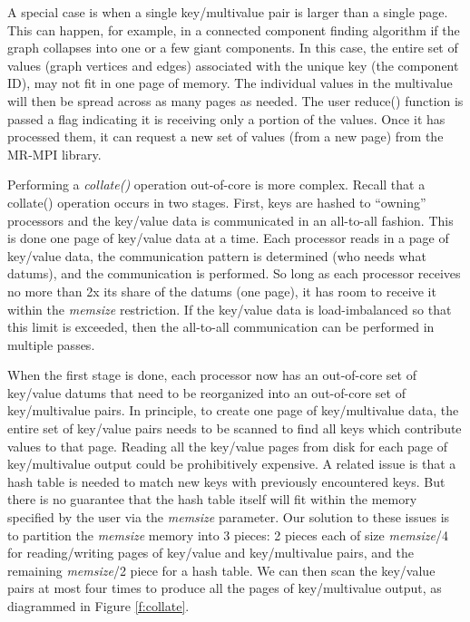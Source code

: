A special case is when a single key/multivalue pair is larger than a
single page.  This can happen, for example, in a connected component
finding algorithm if the graph collapses into one or a few giant
components.  In this case, the entire set of values (graph vertices
and edges) associated with the unique key (the component ID), may not
fit in one page of memory.  The individual values in the multivalue
will then be spread across as many pages as needed.  The user reduce()
function is passed a flag indicating it is receiving only a portion of
the values.  Once it has processed them, it can request a new set of
values (from a new page) from the MR-MPI library.

Performing a {\it collate()} operation out-of-core is more complex.
Recall that a collate() operation occurs in two stages.  First, keys
are hashed to ``owning'' processors and the key/value data is
communicated in an all-to-all fashion.  This is done one page of
key/value data at a time.  Each processor reads in a page of key/value
data, the communication pattern is determined (who needs what datums),
and the communication is performed.  So long as each processor
receives no more than 2x its share of the datums (one page), it has
room to receive it within the {\it memsize} restriction.  If the
key/value data is load-imbalanced so that this limit is exceeded, then
the all-to-all communication can be performed in multiple passes.

When the first stage is done, each processor now has an out-of-core
set of key/value datums that need to be reorganized into an
out-of-core set of key/multivalue pairs.  In principle, to create one
page of key/multivalue data, the entire set of key/value pairs needs
to be scanned to find all keys which contribute values to that page.
Reading all the key/value pages from disk for each page of
key/multivalue output could be prohibitively expensive.  A related
issue is that a hash table is needed to match new keys with previously
encountered keys.  But there is no guarantee that the hash table
itself will fit within the memory specified by the user via the {\it
memsize} parameter.  Our solution to these issues is to partition the
{\it memsize} memory into 3 pieces: 2 pieces each of size {\it
memsize}/4 for reading/writing pages of key/value and key/multivalue
pairs, and the remaining {\it memsize}/2 piece for a hash table.  We
can then scan the key/value pairs at most four times to produce all
the pages of key/multivalue output, as diagrammed in Figure
\ref{f:collate}.

